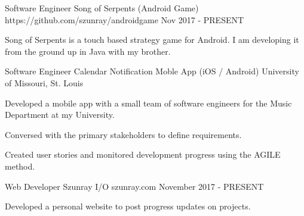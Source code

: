 


\begin{cventries}


\cventry
{Software Engineer} %
{Song of Serpents (Android Game)} %
{https://github.com/szunray/androidgame} %
{Nov 2017 - PRESENT} %
{ %
\begin{cvitems}
\item {Song of Serpents is a touch based strategy game for Android. I am developing it from the ground up in Java with my brother. }
\end{cvitems}
}


\cventry
{Software Engineer} %
{Calendar Notification Moble App (iOS / Android)} %
{University of Missouri, St. Louis} %
{} %
{ %
\begin{cvitems}
\item {Developed a mobile app with a small team of software engineers for the Music Department at my University.} 
\item {Conversed with the primary stakeholders to define requirements.} 
\item {Created user stories and monitored development progress using the AGILE method.} 
\end{cvitems}
}


\cventry
{Web Developer} %
{Szunray I/O} %
{szunray.com} %
{November 2017 - PRESENT} %
{ %
\begin{cvitems}
\item {Developed a personal website to post progress updates on projects.} 
\end{cvitems}
}


\end{cventries}
